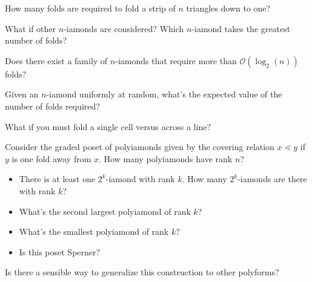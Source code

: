 \documentclass{article}
\begin{document}
\begin{question}
  How many folds are required to fold a strip of $n$ triangles down to one?
\end{question}
\begin{related}
  \item What if other $n$-iamonds are considered? Which $n$-iamond takes the
  greatest number of folds?
  \item Does there exist a family of $n$-iamonds that require more than
    $\mathcal O(\log_2(n))$ folds?
  \item Given an $n$-iamond uniformly at random, what's the expected value of
  the number of folds required?
  \item What if you must fold a single cell versus across a line?
  \item Consider the graded poset of polyiamonds given by the covering relation
  $x \lessdot y$ if $y$ is one fold away from $x$. How many polyiamonds have
  rank $n$?
  \begin{itemize}
    \item There is at least one $2^k$-iamond with rank $k$. How many
    $2^k$-iamonds are there with rank $k$?
    \item What's the second largest polyiamond of rank $k$?
    \item What's the smallest polyiamond of rank $k$?
    \item Is this poset Sperner?
  \end{itemize}
  \item Is there a sensible way to generalize this construction to other polyforms?
\end{related}
\end{document}
